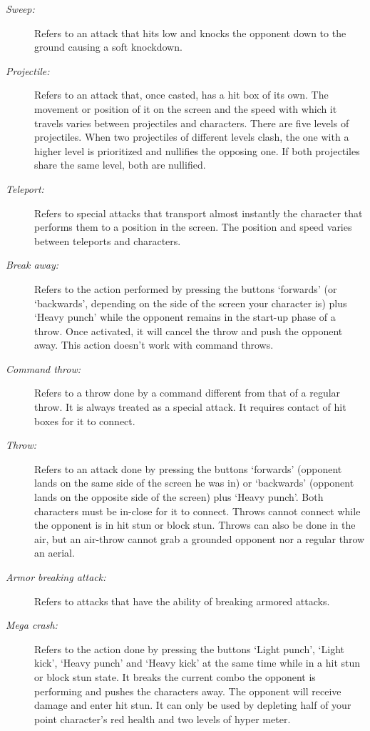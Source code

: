 \documentclass{article}
\begin{document}
\begin{flushleft}
\begin{description}
\item[\textit{Sweep:}] Refers to an attack that hits low and knocks the opponent down to the ground causing a soft knockdown.
\item[\textit{Projectile:}] Refers to an attack that, once casted, has a hit box of its own. The movement or position of it on the screen and the speed with which it travels varies between projectiles and characters. There are five levels of projectiles. When two projectiles of different levels clash, the one with a higher level is prioritized and nullifies the opposing one. If both projectiles share the same level, both are nullified.
\item[\textit{Teleport:}] Refers to special attacks that transport almost instantly the character that performs them to a position in the screen. The position and speed varies between teleports and characters.
\item[\textit{Break away:}] Refers to the action performed by pressing the buttons `forwards' (or `backwards', depending on the side of the screen your character is) plus `Heavy punch' while the opponent remains in the start-up phase of a throw. Once activated, it will cancel the throw and push the opponent away. This action doesn't work with command throws.
\item[\textit{Command throw:}] Refers to a throw done by a command different from that of a regular throw. It is always treated as a special attack. It requires contact of hit boxes for it to connect.
\item[\textit{Throw:}] Refers to an attack done by pressing the buttons `forwards' (opponent lands on the same side of the screen he was in) or `backwards' (opponent lands on the opposite side of the screen) plus `Heavy punch'. Both characters must be in-close for it to connect. Throws cannot connect while the opponent is in hit stun or block stun. Throws can also be done in the air, but an air-throw cannot grab a grounded opponent nor a regular throw an aerial.
\item[\textit{Armor breaking attack:}] Refers to attacks that have the ability of breaking armored attacks.
\item[\textit{Mega crash:}] Refers to the action done by pressing the buttons `Light punch', `Light kick', `Heavy punch' and `Heavy kick' at the same time while in a hit stun or block stun state. It breaks the current combo the opponent is performing and pushes the characters away. The opponent will receive damage and enter hit stun. It can only be used by depleting half of your point character's red health and two levels of hyper meter.

\end{description}
\end{flushleft}
\end{document}
